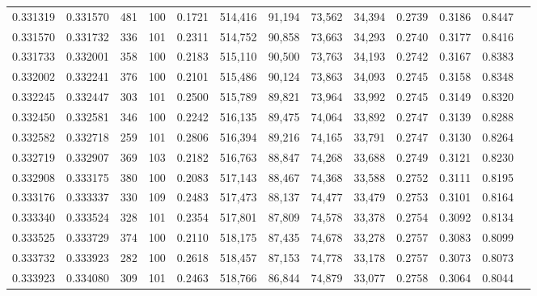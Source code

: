 \begin{tabular}{rrrrrrrrrrrrr}
0.331319 & 0.331570 &   481 & 100 &                                     0.1721 & 514,416 &  91,194 &  73,562 &  34,394 & 0.2739 & 0.3186 & 0.8447 \\
0.331570 & 0.331732 &   336 & 101 &                                     0.2311 & 514,752 &  90,858 &  73,663 &  34,293 & 0.2740 & 0.3177 & 0.8416 \\
0.331733 & 0.332001 &   358 & 100 &                                     0.2183 & 515,110 &  90,500 &  73,763 &  34,193 & 0.2742 & 0.3167 & 0.8383 \\
0.332002 & 0.332241 &   376 & 100 &                                     0.2101 & 515,486 &  90,124 &  73,863 &  34,093 & 0.2745 & 0.3158 & 0.8348 \\
0.332245 & 0.332447 &   303 & 101 &                                     0.2500 & 515,789 &  89,821 &  73,964 &  33,992 & 0.2745 & 0.3149 & 0.8320 \\
0.332450 & 0.332581 &   346 & 100 &                                     0.2242 & 516,135 &  89,475 &  74,064 &  33,892 & 0.2747 & 0.3139 & 0.8288 \\
0.332582 & 0.332718 &   259 & 101 &                                     0.2806 & 516,394 &  89,216 &  74,165 &  33,791 & 0.2747 & 0.3130 & 0.8264 \\
0.332719 & 0.332907 &   369 & 103 &                                     0.2182 & 516,763 &  88,847 &  74,268 &  33,688 & 0.2749 & 0.3121 & 0.8230 \\
0.332908 & 0.333175 &   380 & 100 &                                     0.2083 & 517,143 &  88,467 &  74,368 &  33,588 & 0.2752 & 0.3111 & 0.8195 \\
0.333176 & 0.333337 &   330 & 109 &                                     0.2483 & 517,473 &  88,137 &  74,477 &  33,479 & 0.2753 & 0.3101 & 0.8164 \\
0.333340 & 0.333524 &   328 & 101 &                                     0.2354 & 517,801 &  87,809 &  74,578 &  33,378 & 0.2754 & 0.3092 & 0.8134 \\
0.333525 & 0.333729 &   374 & 100 &                                     0.2110 & 518,175 &  87,435 &  74,678 &  33,278 & 0.2757 & 0.3083 & 0.8099 \\
0.333732 & 0.333923 &   282 & 100 &                                     0.2618 & 518,457 &  87,153 &  74,778 &  33,178 & 0.2757 & 0.3073 & 0.8073 \\
0.333923 & 0.334080 &   309 & 101 &                                     0.2463 & 518,766 &  86,844 &  74,879 &  33,077 & 0.2758 & 0.3064 & 0.8044 \\

\end{tabular}
